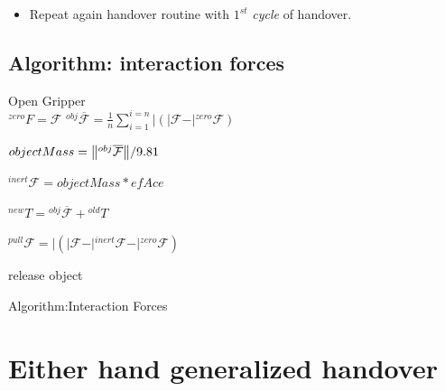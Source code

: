 \begin{itemize}
    \item Repeat again handover routine with $1^{st}$ \textit{cycle} of handover.
\end{itemize}


\subsection{Algorithm: interaction forces}
\begin{algorithm}[H]\label{interaction forces}
	\DontPrintSemicolon
	\SetNoFillComment
	
	
	{
		{
		    Open Gripper\\
			$\mathcal{}^{zero}{F}= \mathcal{F}$
		}
		${}^{obj}\overline{\mathcal{F}} = \frac{1}{n}\sum_{i=1}^{i=n} \vert{ (\vert{\mathcal{F}} - \vert{{}^{zero}\mathcal{F}}) }$
		
		$objectMass = \norm{{}^{obj}\overline{\mathcal{F}}}/9.81 $
		
		${}^{inert}\mathcal{F} = objectMass * efAce$ 
		
		${}^{new}T = {}^{obj}\overline{\mathcal{F}} + {}^{old}T$
		
		{	
			${}^{pull}\mathcal{F} = \vert{(\vert\mathcal{{F}} - \vert{}^{inert}\mathcal{{F}} - \vert{}^{zero}\mathcal{{F}}) }$
			
			{
				\textrm{release object}
			}
		}
	}
	\caption{Algorithm:Interaction Forces}
\end{algorithm}



\section{Either hand generalized handover}\label{both hands individual}

